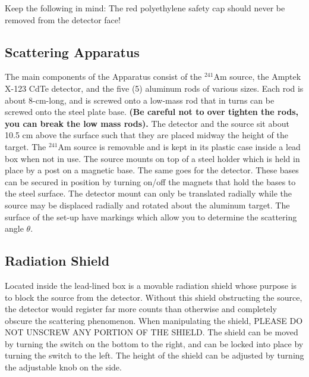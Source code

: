 \documentclass{../lab}
\begin{document}
Keep the following in mind: The red polyethylene safety cap should never be removed from the detector face!

\subsection{Scattering Apparatus}

The main components of the Apparatus consist of the $^{241}$Am source, the Amptek X-123 CdTe detector, and the five (5) aluminum rods of various sizes. Each rod is about 8-cm-long, and is screwed onto a low-mass rod that in turns can be screwed onto the steel plate base. \textbf{(Be careful not to over tighten the rods, you can break the low mass rods).} The detector and the source sit about 10.5 cm above the surface such that they are placed midway the height of the target. The $^{241}$Am source is removable and is kept in its plastic case inside a lead box when not in use. The source mounts on top of a steel holder which is held in place by a post on a magnetic base. The same goes for the detector. These bases can be secured in position by turning on/off the magnets that hold the bases to the steel surface. The detector mount can only be translated radially while the source may be displaced radially and rotated about the aluminum target. The surface of the set-up have markings which allow you to determine the scattering angle $\theta$.

\subsection{Radiation Shield}

Located inside the lead-lined box is a movable radiation shield whose purpose is to block the source from the detector. Without this shield obstructing the source, the detector would register far more counts than otherwise and completely obscure the scattering phenomenon. When manipulating the shield, PLEASE DO NOT UNSCREW ANY PORTION OF THE SHIELD. The shield can be moved by turning the switch on the bottom to the right, and can be locked into place by turning the switch to the left. The height of the shield can be adjusted by turning the adjustable knob on the side.
\end{document}
